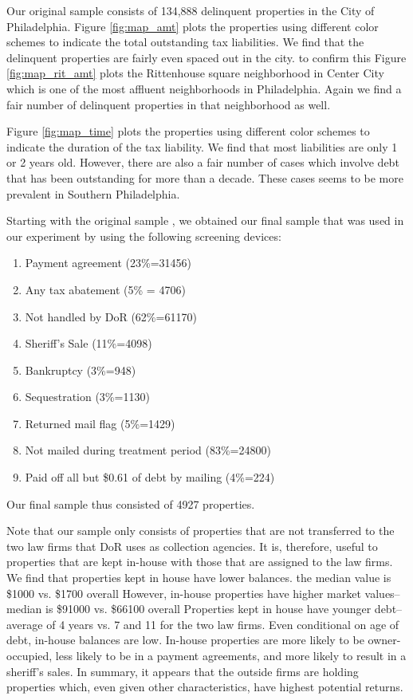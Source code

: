 \documentclass[12pt,titlepage]{article}
\begin{document}
Our original sample consists of 134,888 delinquent properties in the
City of Philadelphia. Figure \ref{fig:map_amt} plots the properties
using different color schemes to indicate the total outstanding tax
liabilities.  We find that the delinquent properties are fairly even
spaced out in the city. to confirm this Figure \ref{fig:map_rit_amt}
plots the Rittenhouse square neighborhood in Center City which is one
of the most affluent neighborhoods in Philadelphia. Again we find a
fair number of delinquent properties in that neighborhood as well.

Figure \ref{fig:map_time} plots the properties using different color
schemes to indicate the duration of the tax liability. We find that
most liabilities are only 1 or 2 years old. However, there are also a
fair number of cases which involve debt that has been outstanding for
more than a decade. These cases seems to be more prevalent in Southern
Philadelphia.

Starting with the original sample , we obtained our final sample that
was used in our experiment by using the following screening devices:
\begin{enumerate}
\item Payment agreement (23\%=31456)
\item Any tax abatement (5\% = 4706)
\item Not handled by DoR (62\%=61170)
\item Sheriff's Sale (11\%=4098)
\item Bankruptcy (3\%=948)
\item Sequestration (3\%=1130)
\item Returned mail flag (5\%=1429)
\item Not mailed during treatment period (83\%=24800)
\item Paid off all but \$0.61 of debt by mailing (4\%=224)
\end{enumerate}
Our final sample thus consisted of 4927 properties. 

Note that our sample only consists of properties that are not
transferred to the two law firms that DoR uses as collection
agencies. It is, therefore, useful to properties that are kept
in-house with those that are assigned to the law firms. We find that
properties kept in house have lower balances. the median value is
\$1000 vs. \$1700 overall However, in-house properties have higher
market values--median is \$91000 vs. \$66100 overall Properties kept
in house have younger debt--average of 4 years vs. 7 and 11 for the
two law firms.  Even conditional on age of debt, in-house balances are
low.  In-house properties are more likely to be owner-occupied, less
likely to be in a payment agreements, and more likely to result in a
sheriff's sales. In summary, it appears that the outside firms are
holding properties which, even given other characteristics, have
highest potential returns.
\end{document}
